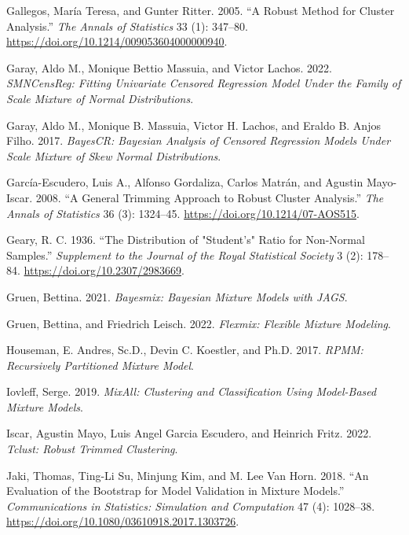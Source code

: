 \begin{CSLReferences}{1}{0}
\leavevmode{}%
Gallegos, María Teresa, and Gunter Ritter. 2005. {``A Robust Method for Cluster Analysis.''} \emph{The Annals of Statistics} 33 (1): 347--80. \url{https://doi.org/10.1214/009053604000000940}.

\leavevmode{}%
Garay, Aldo M., Monique Bettio Massuia, and Victor Lachos. 2022. \emph{SMNCensReg: Fitting Univariate Censored Regression Model Under the Family of Scale Mixture of Normal Distributions}.

\leavevmode{}%
Garay, Aldo M., Monique B. Massuia, Victor H. Lachos, and Eraldo B. Anjos Filho. 2017. \emph{BayesCR: Bayesian Analysis of Censored Regression Models Under Scale Mixture of Skew Normal Distributions}.

\leavevmode{}%
García-Escudero, Luis A., Alfonso Gordaliza, Carlos Matrán, and Agustin Mayo-Iscar. 2008. {``A General Trimming Approach to Robust Cluster Analysis.''} \emph{The Annals of Statistics} 36 (3): 1324--45. \url{https://doi.org/10.1214/07-AOS515}.

\leavevmode{}%
Geary, R. C. 1936. {``The {Distribution} of "{Student}'s" {Ratio} for {Non-Normal Samples}.''} \emph{Supplement to the Journal of the Royal Statistical Society} 3 (2): 178--84. \url{https://doi.org/10.2307/2983669}.

\leavevmode{}%
Gruen, Bettina. 2021. \emph{Bayesmix: Bayesian Mixture Models with JAGS}.

\leavevmode{}%
Gruen, Bettina, and Friedrich Leisch. 2022. \emph{Flexmix: Flexible Mixture Modeling}.

\leavevmode{}%
Houseman, E. Andres, Sc.D., Devin C. Koestler, and Ph.D. 2017. \emph{RPMM: Recursively Partitioned Mixture Model}.

\leavevmode{}%
Iovleff, Serge. 2019. \emph{MixAll: Clustering and Classification Using Model-Based Mixture Models}.

\leavevmode{}%
Iscar, Agustin Mayo, Luis Angel Garcia Escudero, and Heinrich Fritz. 2022. \emph{Tclust: Robust Trimmed Clustering}.

\leavevmode{}%
Jaki, Thomas, Ting-Li Su, Minjung Kim, and M. Lee Van Horn. 2018. {``An Evaluation of the Bootstrap for Model Validation in Mixture Models.''} \emph{Communications in Statistics: Simulation and Computation} 47 (4): 1028--38. \url{https://doi.org/10.1080/03610918.2017.1303726}.


\end{CSLReferences}
